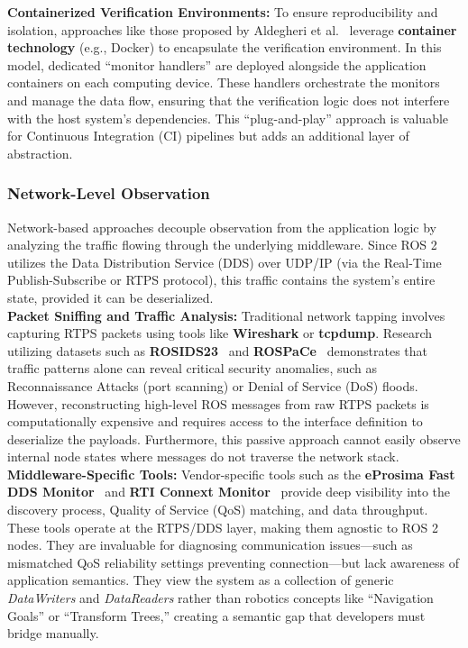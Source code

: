 \textbf{Containerized Verification Environments:} To ensure reproducibility and isolation, approaches like those proposed by Aldegheri et al.~\cite{containerized-ROS-compliant} leverage \textbf{container technology} (e.g., Docker) to encapsulate the verification environment. In this model, dedicated ``monitor handlers'' are deployed alongside the application containers on each computing device. These handlers orchestrate the monitors and manage the data flow, ensuring that the verification logic does not interfere with the host system's dependencies. This ``plug-and-play'' approach is valuable for Continuous Integration (CI) pipelines but adds an additional layer of abstraction.

\subsubsection{Network-Level Observation}
Network-based approaches decouple observation from the application logic by analyzing the traffic flowing through the underlying middleware. Since ROS 2 utilizes the Data Distribution Service (DDS) over UDP/IP (via the Real-Time Publish-Subscribe or RTPS protocol), this traffic contains the system's entire state, provided it can be deserialized. \\

\textbf{Packet Sniffing and Traffic Analysis:} Traditional network tapping involves capturing RTPS packets using tools like \textbf{Wireshark} or \textbf{tcpdump}. Research utilizing datasets such as \textbf{ROSIDS23}~\cite{ROSIDS23} and \textbf{ROSPaCe}~\cite{ROSPACE} demonstrates that traffic patterns alone can reveal critical security anomalies, such as Reconnaissance Attacks (port scanning) or Denial of Service (DoS) floods. However, reconstructing high-level ROS messages from raw RTPS packets is computationally expensive and requires access to the interface definition to deserialize the payloads. Furthermore, this passive approach cannot easily observe internal node states where messages do not traverse the network stack. \\

\textbf{Middleware-Specific Tools:} Vendor-specific tools such as the \textbf{eProsima Fast DDS Monitor}~\cite{fastddsmonitor} and \textbf{RTI Connext Monitor}~\cite{rtimonitor} provide deep visibility into the discovery process, Quality of Service (QoS) matching, and data throughput. These tools operate at the RTPS/DDS layer, making them agnostic to ROS 2 nodes. They are invaluable for diagnosing communication issues—such as mismatched QoS reliability settings preventing connection—but lack awareness of application semantics. They view the system as a collection of generic \textit{DataWriters} and \textit{DataReaders} rather than robotics concepts like ``Navigation Goals'' or ``Transform Trees,'' creating a semantic gap that developers must bridge manually.

